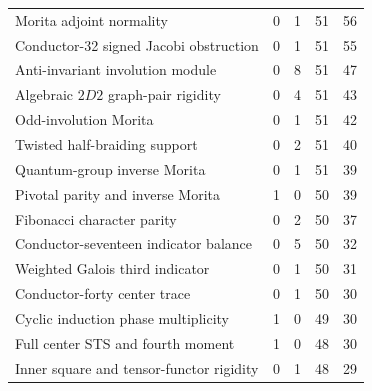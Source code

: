 \begin{tabular}{@{}lrrrr@{}}
Morita adjoint normality & 0 & 1 & 51 & 56\\
Conductor-32 signed Jacobi obstruction & 0 & 1 & 51 & 55\\
Anti-invariant involution module & 0 & 8 & 51 & 47\\
Algebraic $2D2$ graph-pair rigidity & 0 & 4 & 51 & 43\\
Odd-involution Morita & 0 & 1 & 51 & 42\\
Twisted half-braiding support & 0 & 2 & 51 & 40\\
Quantum-group inverse Morita & 0 & 1 & 51 & 39\\
Pivotal parity and inverse Morita & 1 & 0 & 50 & 39\\
Fibonacci character parity & 0 & 2 & 50 & 37\\
Conductor-seventeen indicator balance & 0 & 5 & 50 & 32\\
Weighted Galois third indicator & 0 & 1 & 50 & 31\\
Conductor-forty center trace & 0 & 1 & 50 & 30\\
Cyclic induction phase multiplicity & 1 & 0 & 49 & 30\\
Full center STS and fourth moment & 1 & 0 & 48 & 30\\
Inner square and tensor-functor rigidity & 0 & 1 & 48 & 29\\
\bottomrule
\end{tabular}
